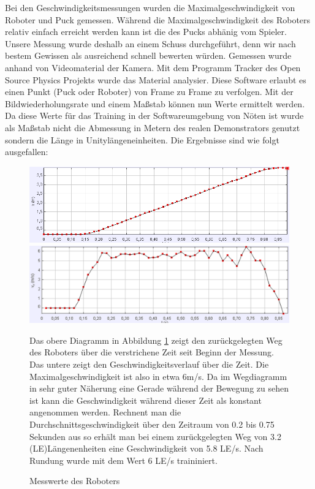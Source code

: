 Bei den Geschwindigkeitsmessungen wurden die Maximalgeschwindigkeit von Roboter und Puck gemessen. Während die Maximalgeschwindigkeit des Roboters relativ einfach erreicht werden kann ist die des Pucks abhänig vom Spieler. Unsere Messung wurde deshalb an einem Schuss durchgeführt, denn wir nach bestem Gewissen als ausreichend schnell bewerten würden. Gemessen wurde anhand von Videomaterial der Kamera. Mit dem Programm Tracker des Open Source Physics Projekts \cite{tracker} wurde das Material analysier. Diese Software erlaubt es einen Punkt (Puck oder Roboter) von Frame zu Frame zu verfolgen. Mit der Bildwiederholungsrate und einem Maßstab können nun Werte ermittelt werden. Da diese Werte für das Training in der Softwareumgebung von Nöten ist wurde als Maßstab nicht die Abmessung in Metern des realen Demonstrators genutzt sondern die Länge in Unitylängeneinheiten. Die Ergebnisse sind wie folgt ausgefallen:\\
\begin{figure}
\includegraphics[width=\textwidth]{images/messung_robo_x}
\includegraphics[width=\textwidth]{images/messung_robo_v}
 \caption{Messwerte des Roboters }
 \label{mess_robo}

Das obere Diagramm in Abbildung \ref{mess_robo} zeigt den zurückgelegten Weg des Roboters über die verstrichene Zeit seit Beginn der Messung. Das untere zeigt den Geschwindigkeitsverlauf über die Zeit. Die Maximalgeschwindigkeit ist also in etwa 6m/s. Da im Wegdiagramm in sehr guter Näherung eine Gerade während der Bewegung zu sehen ist kann die Geschwindigkeit während dieser Zeit als konstant angenommen werden. Rechnent man die Durchschnittsgeschwindigkeit über den Zeitraum von 0.2 bis 0.75 Sekunden aus so erhält man bei einem zurückgelegten Weg von 3.2 (LE)Längenenheiten eine Geschwindigkeit von 5.8 LE/s. Nach Rundung wurde mit dem Wert 6 LE/s traininiert.
\end{figure}

